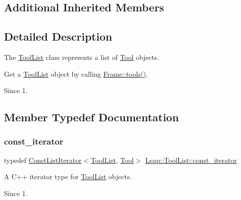 \subsection*{Additional Inherited Members}


\subsection{Detailed Description}
The \hyperlink{class_leap_1_1_tool_list}{Tool\+List} class represents a list of \hyperlink{class_leap_1_1_tool}{Tool} objects.

Get a \hyperlink{class_leap_1_1_tool_list}{Tool\+List} object by calling \hyperlink{class_leap_1_1_frame_a22ade80385331bef910b3bff3abd121c}{Frame\+::tools()}.


\begin{DoxyCodeInclude}
\end{DoxyCodeInclude}


\begin{DoxySince}{Since}
1. 
\end{DoxySince}


\subsection{Member Typedef Documentation}
\mbox{\label{class_leap_1_1_tool_list_a7f52ee5561016e8d42512e2adbc820de}} 
\subsubsection{\texorpdfstring{const\+\_\+iterator}{const\_iterator}}
{\footnotesize\ttfamily typedef \hyperlink{class_leap_1_1_const_list_iterator}{Const\+List\+Iterator}$<$\hyperlink{class_leap_1_1_tool_list}{Tool\+List}, \hyperlink{class_leap_1_1_tool}{Tool}$>$ \hyperlink{class_leap_1_1_tool_list_a7f52ee5561016e8d42512e2adbc820de}{Leap\+::\+Tool\+List\+::const\+\_\+iterator}}

A C++ iterator type for \hyperlink{class_leap_1_1_tool_list}{Tool\+List} objects.


\begin{DoxyCodeInclude}
\end{DoxyCodeInclude}


\begin{DoxySince}{Since}
1. 
\end{DoxySince}


